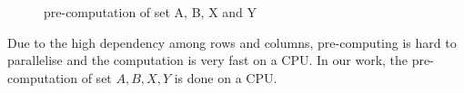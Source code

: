 \documentclass[AMA,LATO1COL]{WileyNJD-v2}
\begin{document}
\begin{figure}[h]
\centering
{}
~~\\
~~
~~
\caption{pre-computation of set A, B, X and Y}\label{prec}
\end{figure}

Due to the high dependency among rows and columns, pre-computing is hard to parallelise and the computation is very fast on a CPU. In our work, the pre-computation of set $A, B, X, Y$ is done on a CPU.
\end{document}
